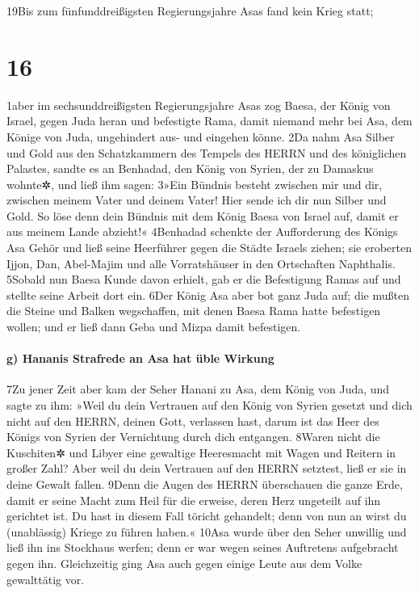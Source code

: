 19Bis zum fünfunddreißigsten Regierungsjahre Asas fand kein Krieg statt;

\hypertarget{section-15}{%
\section{16}\label{section-15}}

1aber im sechsunddreißigsten Regierungsjahre Asas zog Baesa, der König
von Israel, gegen Juda heran und befestigte Rama, damit niemand mehr bei
Asa, dem Könige von Juda, ungehindert aus- und eingehen könne. 2Da nahm
Asa Silber und Gold aus den Schatzkammern des Tempels des HERRN und des
königlichen Palastes, sandte es an Benhadad, den König von Syrien, der
zu Damaskus wohnte✲, und ließ ihm sagen: 3»Ein Bündnis besteht zwischen
mir und dir, zwischen meinem Vater und deinem Vater! Hier sende ich dir
nun Silber und Gold. So löse denn dein Bündnis mit dem König Baesa von
Israel auf, damit er aus meinem Lande abzieht!« 4Benhadad schenkte der
Aufforderung des Königs Asa Gehör und ließ seine Heerführer gegen die
Städte Israels ziehen; sie eroberten Ijjon, Dan, Abel-Majim und alle
Vorratshäuser in den Ortschaften Naphthalis. 5Sobald nun Baesa Kunde
davon erhielt, gab er die Befestigung Ramas auf und stellte seine Arbeit
dort ein. 6Der König Asa aber bot ganz Juda auf; die mußten die Steine
und Balken wegschaffen, mit denen Baesa Rama hatte befestigen wollen;
und er ließ dann Geba und Mizpa damit befestigen.

\hypertarget{g-hananis-strafrede-an-asa-hat-uxfcble-wirkung}{%
\paragraph{g) Hananis Strafrede an Asa hat üble
Wirkung}\label{g-hananis-strafrede-an-asa-hat-uxfcble-wirkung}}

7Zu jener Zeit aber kam der Seher Hanani zu Asa, dem König von Juda, und
sagte zu ihm: »Weil du dein Vertrauen auf den König von Syrien gesetzt
und dich nicht auf den HERRN, deinen Gott, verlassen hast, darum ist das
Heer des Königs von Syrien der Vernichtung durch dich entgangen. 8Waren
nicht die Kuschiten✲ und Libyer eine gewaltige Heeresmacht mit Wagen und
Reitern in großer Zahl? Aber weil du dein Vertrauen auf den HERRN
setztest, ließ er sie in deine Gewalt fallen. 9Denn die Augen des HERRN
überschauen die ganze Erde, damit er seine Macht zum Heil für die
erweise, deren Herz ungeteilt auf ihn gerichtet ist. Du hast in diesem
Fall töricht gehandelt; denn von nun an wirst du (unablässig) Kriege zu
führen haben.« 10Asa wurde über den Seher unwillig und ließ ihn ins
Stockhaus werfen; denn er war wegen seines Auftretens aufgebracht gegen
ihn. Gleichzeitig ging Asa auch gegen einige Leute aus dem Volke
gewalttätig vor.

